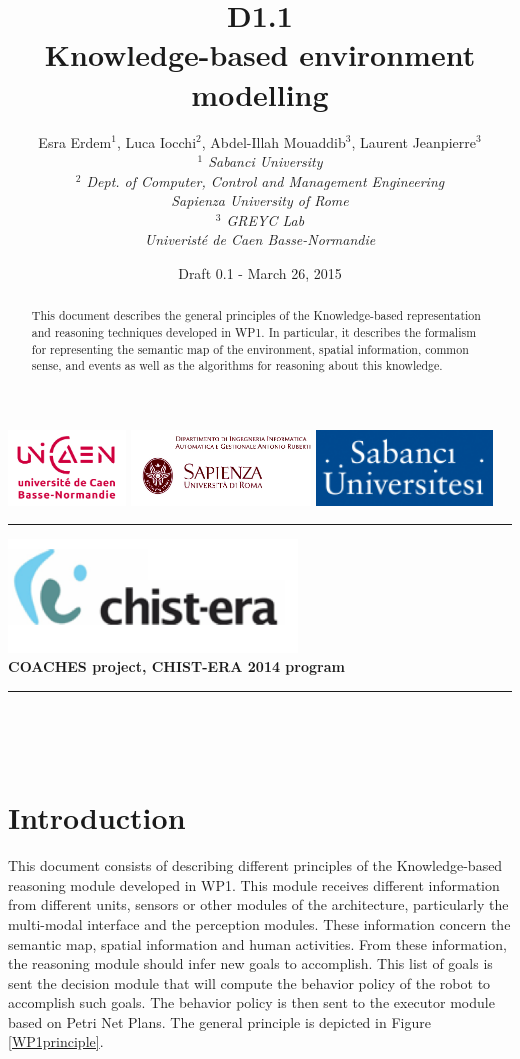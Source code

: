 \documentclass{article}
\title{D1.1\\ 
Knowledge-based environment modelling}
\author{Esra Erdem$^1$, Luca Iocchi$^2$, Abdel-Illah Mouaddib$^3$,  Laurent Jeanpierre$^3$ \\
\textit{
$^1$ Sabanci University\\
$^2$ Dept. of Computer, Control and Management Engineering\\
Sapienza University of Rome\\
$^3$ GREYC Lab\\
Univeristé de Caen Basse-Normandie}}
\date{Draft 0.1 - March 26, 2015}
\newcommand{\makemadtitle}{
  \hrule
  \vspace{.5em}
  \noindent
  \begin{center}
  \textbf{
  {\centering\includegraphics[height=3cm]{../fig/logoCHISTERA2014.png}}\\
   {\centering\Large COACHES project, CHIST-ERA 2014 program}
  }
  \end{center}
  \vspace{.5em}
 
  \hrule
  \vspace{3em}
  \begin{center}
    \begin{Large}\textbf{\usebox{\notetitle}}\end{Large}\\[2em]
    \begin{large}\usebox{\noteauthor}\\ [2em] 
    \usebox{\notedate}\end{large}
  \end{center}
  \vspace{3em}
}
\begin{document}
\includegraphics[height=2cm]{../fig/logoUNICAEN.jpg}
\includegraphics[height=2cm]{../fig/logoSapienza.png}
\includegraphics[height=2cm]{../fig/logoSebanci}


\makemadtitle

\begin{abstract}
This document describes the general principles of the Knowledge-based representation and reasoning techniques developed in WP1. In particular, it describes the formalism for representing the semantic map of the environment, spatial information, common sense, and events as well as the algorithms for reasoning about this knowledge. 
\end{abstract}

\vspace*{1.5cm}

\newpage
\section{Introduction}
This document consists of describing different principles of the Knowledge-based reasoning module developed in WP1. This  module receives different information from different units, sensors or other modules of the architecture, particularly the multi-modal interface and the perception modules. These information concern the semantic map, spatial information and human activities. From these information, the reasoning module should infer new goals to accomplish. This list of goals is sent the decision module that will compute the behavior policy of the robot to accomplish such goals. The behavior policy is then sent to the executor module based on Petri Net Plans. The general principle is depicted in Figure \ref{WP1principle}.
\end{document}
